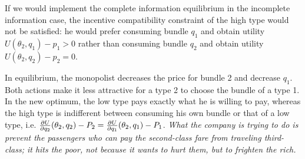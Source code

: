 If we would implement the complete information equilibrium in the incomplete information case, the incentive compatibility constraint of the
high type would not be satisfied: he would prefer consuming bundle $q_1$ and obtain utility $U(\theta_2,q_1)-p_1>0$ rather than consuming bundle
$q_2$ and obtain utility $U(\theta_2,q_2)-p_2=0$.

In equilibrium, the monopolist decreases the price for bundle 2 and decrease $q_1$. Both actions make it less attractive for a type 2 to choose
the bundle of a type 1. In the new optimum, the low type pays exactly what he is willing to pay, whereas the high type is indifferent between
consuming his own bundle or that of a low type, i.e. $\frac{\partial U}{\partial q_2}(\theta_2,q_2)-P_2=\frac{\partial U}{\partial q_1}(\theta_2,q_1)-P_1$.
\textit{What the company is trying to do is prevent
	the passengers who can pay the second-class fare from traveling third-class; it hits the
	poor, not because it wants to hurt them, but to frighten the rich.}
